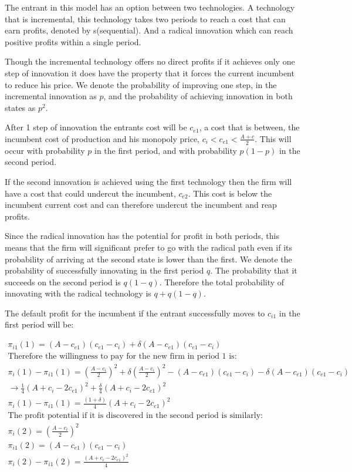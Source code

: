 \documentclass{article}
\begin{document}
The entrant in this model has an option between two technologies. A technology that is incremental, this technology takes two periods to reach a cost that can earn profits, denoted by s(sequential). And a radical innovation which can reach positive profits within a single period. 

Though the incremental technology offers no direct profits if it achieves only one step of innovation it does have the property that it forces the current incumbent to reduce his price. We denote the probability of improving one step, in the incremental innovation as $p$, and the probability of achieving innovation in both states as $p^2$. 

After 1 step of innovation the entrants cost will be $c_{e1}$, a cost that is between, the incumbent cost of production and his monopoly price, $c_i<c_{e1}< \frac{A+c}{2}$. This will occur with probability $p$ in the first period, and with probability $p(1-p)$ in the second period. 

If the second innovation is achieved using the first technology then the firm will have a cost that could undercut the incumbent, $c_{e2}$. This cost is below the incumbent current cost and can therefore undercut the incumbent and reap profits. 

Since the radical innovation has the potential for profit in both periods, this means that the firm will significant prefer to go with the radical path even if its probability of arriving at the second state is lower than the first. We denote the probability of successfully innovating in the first period $q$. The probability that it succeeds on the second period is $q(1-q)$. Therefore the total probability of innovating with the radical technology is $q+q(1-q)$. 

The default profit for the incumbent if the entrant successfully moves to $c_{i1}$ in the first period will be:

\begin{align*}
\pi_{i1}(1) =(A-c_{e1})(c_{e1}-c_i) + \delta(A-c_{e1})(c_{e1}-c_i) \\
\text{Therefore the willingness to pay for the new firm in period 1 is:} \\
\pi_i(1)-\pi_{i1}(1) =\left(\frac{A-c_i}{2}\right)^2 + \delta \left(\frac{A-c_i}{2}\right)^2-(A-c_{e1})(c_{e1}-c_i) - \delta(A-c_{e1})(c_{e1}-c_i) \\
\rightarrow \frac{1}{4}(A+c_i-2c_{e1})^2 + \frac{\delta}{4}(A+c_i-2c_{e1})^2  \\
\pi_i(1)-\pi_{i1}(1) = \frac{(1+\delta)}{4}\left(A+c_i-2c_{e1} \right)^2 \\
\text{The profit potential if it is discovered in the second period is similarly:} \\
\pi_i(2) = \left(\frac{A-c_i}{2}\right)^2 \\
\pi_{i1}(2) = (A-c_{e1})(c_{e1}-c_i) \\
\pi_i(2) - \pi_{i1}(2) = \frac{(A+c_i-2c_{e1})^2}{4}
\end{align*}
\end{document}
